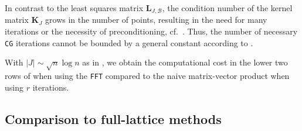 \documentclass[a4paper]{amsart}
\begin{document}
In contrast to the least squares matrix $\bm L_{J,\mathcal B}$, the condition number of the kernel matrix $\bm K_J$ grows in the number of points, resulting in the need for many iterations or the necessity of preconditioning, cf.\ \cite[Section~12.2]{W04}.
Thus, the number of necessary \texttt{CG} iterations cannot be bounded by a general constant according to .

With $|J| \sim \sqrt n \log n$ as in , we obtain the computational cost in the lower two rows of  when using the \texttt{FFT} compared to the naive matrix-vector product when using $r$ iterations.



\subsection{Comparison to full-lattice methods} 
\end{document}
